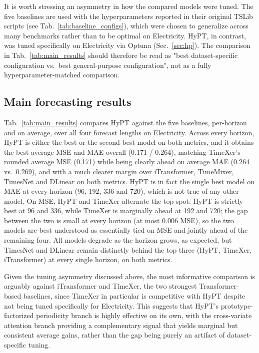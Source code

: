 \documentclass[10pt,journal]{IEEEtran}
\newcommand{\tab}[1]{Tab.~\ref{#1}}
\newcommand{\secref}[1]{Sec.~\ref{#1}}
\begin{document}
It is worth stressing an asymmetry in how the compared models were tuned. The five baselines are used with the hyperparameters reported in their original TSLib scripts (see \tab{tab:baseline_configs}), which were chosen to generalize across many benchmarks rather than to be optimal on Electricity. HyPT, in contrast, was tuned specifically on Electricity via Optuna (\secref{sec:hp}). The comparison in \tab{tab:main_results} should therefore be read as "best dataset-specific configuration vs.\ best general-purpose configuration", not as a fully hyperparameter-matched comparison.

\subsection{Main forecasting results}
\tab{tab:main_results} compares HyPT against the five baselines, per-horizon and on average, over all four forecast lengths on Electricity. Across every horizon, HyPT is either the best or the second-best model on both metrics, and it obtains the best average MSE and MAE overall (0.171 / 0.264), matching TimeXer's rounded average MSE (0.171) while being clearly ahead on average MAE (0.264 vs.\ 0.269), and with a much clearer margin over iTransformer, TimeMixer, TimesNet and DLinear on both metrics. HyPT is in fact the single best model on MAE at every horizon (96, 192, 336 and 720), which is not true of any other model. On MSE, HyPT and TimeXer alternate the top spot: HyPT is strictly best at 96 and 336, while TimeXer is marginally ahead at 192 and 720; the gap between the two is small at every horizon (at most 0.006 MSE), so the two models are best understood as essentially tied on MSE and jointly ahead of the remaining four. All models degrade as the horizon grows, as expected, but TimesNet and DLinear remain distinctly behind the top three (HyPT, TimeXer, iTransformer) at every single horizon, on both metrics.

Given the tuning asymmetry discussed above, the most informative comparison is arguably against iTransformer and TimeXer, the two strongest Transformer-based baselines, since TimeXer in particular is competitive with HyPT despite not being tuned specifically for Electricity. This suggests that HyPT's prototype-factorized periodicity branch is highly effective on its own, with the cross-variate attention branch providing a complementary signal that yields marginal but consistent average gains, rather than the gap being purely an artifact of dataset-specific tuning.
\end{document}
